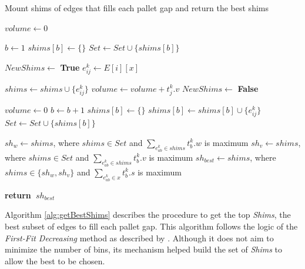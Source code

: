 \documentclass[preprint,authoryear]{elsarticle}
\renewcommand{\Return}{\State \bf {return}~}
\begin{document}
\begin{algorithm}[H]
	\caption{Mount shims of edges that fills each pallet gap and return the best shims}  \label{alg:getBestShims}
	\begin{algorithmic}[1]
		
		
		\State $volume \gets 0$	
		
		\State $b \gets 1$
		\State $shims[b] \gets \{\}$  \label{empty_shims}
		\State $Set \gets Set \cup \{shims[b]\}$ \label{empty_set}
		
		 \label{edges_indexes}
		
		
		\State $NewShims \gets$ {\bf True} \label{new_shims}
		\State $e_{ij}^k \gets E[i][x]$
		
		 \label{shims_set}
		
		
		
		\State $shims \gets shims \cup \{e_{ij}^k\}$
		\State $volume \gets volume + t_j^k.v$
		\State $NewShims \gets$ {\bf False} \label{new_shims_false}
		
		
		\EndIf
		
		\EndFor 
		
		 \label{new_shims2}
		\State $volume \gets 0$
		\State $b \gets b + 1$
		\State $shims[b] \gets \{\}$
		\State $shims[b] \gets shims[b] \cup \{e_{ij}^k\}$
		\State $Set \gets Set \cup \{shims[b]\}$
		\EndIf
		
		\EndFor 
		
		\State $sh_w \gets shims$, where $shims \in Set$ and $\sum_{e_{ab}^k \in shims} t_b^k.w$ is maximum  \label{best_weight}		
		\State $sh_v \gets shims$, where $shims \in Set$ and $\sum_{e_{ab}^k \in shims} t_b^k.v$ is maximum \label{best_volume}
		\State $sh_{best} \gets shims$, where $shims \in \{sh_w, sh_v\}$ and $\sum_{e_{ab}^k \in x} t_b^k.s$ is maximum \label{best_score}
		
		\Return $sh_{best}$
		
		\EndProcedure
		
	\end{algorithmic}
\end{algorithm}

Algorithm \ref{alg:getBestShims} describes the procedure to get the top {\it Shims}, the best subset of edges to fill each pallet gap. This algorithm follows the logic of the {\it First-Fit Decreasing} method as described by \cite{JohnsonGarey1985}. Although it does not aim to minimize the number of bins, its mechanism helped build the set of {\it Shims} to allow the best to be chosen.
\end{document}
